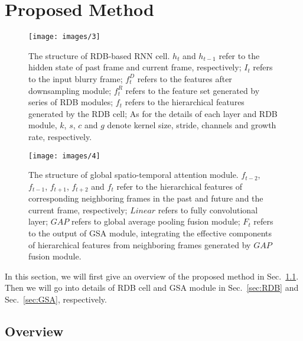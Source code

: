 \documentclass[twocolumn]{svjour3}          \smartqed  \usepackage{graphicx}
\begin{document}
\section{Proposed Method}
\label{sec:method}
\begin{figure*}[!t]
	\centering
	\texttt{[image: images/3]}
	\caption{The structure of RDB-based RNN cell. $h_t$ and $h_{t-1}$ refer to the hidden state of past frame and current frame, respectively; $I_t$ refers to the input blurry frame; $f_t^D$ refers to the features after downsampling module; $f_t^R$ refers to the feature set generated by series of RDB modules; $f_t$ refers to the hierarchical features generated by the RDB cell; As for the details of each layer and RDB module, $k$, $s$, $c$ and $g$ denote kernel size, stride, channels and growth rate, respectively.}
	\label{fig:rdb}
\end{figure*}

\begin{figure}[!t]
	\centering
	\texttt{[image: images/4]}
	\caption{The structure of global spatio-temporal attention module. $f_{t-2}$, $f_{t-1}$, $f_{t+1}$, $f_{t+2}$ and $f_t$ refer to the hierarchical features of corresponding neighboring frames in the past and future and the current frame, respectively; $Linear$ refers to fully convolutional layer; $GAP$ refers to global average pooling fusion module; $F_t$ refers to the output of GSA module, integrating the effective components of hierarchical features from neighboring frames generated by $GAP$ fusion module.}
	\label{fig:gsa}
\end{figure}

In this section, we will first give an overview of the proposed method in Sec.~\ref{sec:overview}. Then we will go into details of RDB cell and GSA module in Sec.~\ref{sec:RDB} and Sec.~\ref{sec:GSA}, respectively.

\subsection{Overview}
\label{sec:overview}
\end{document}
